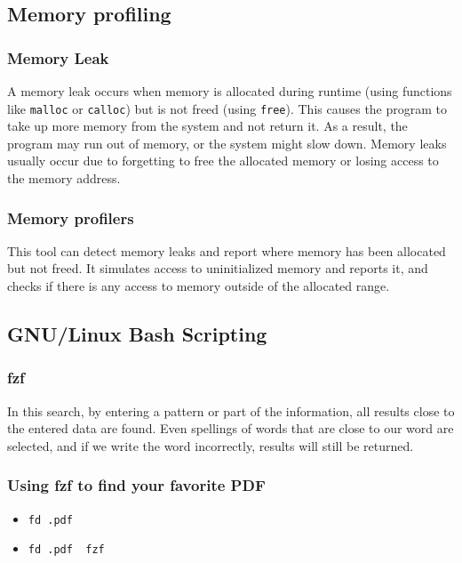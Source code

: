 \documentclass{article}
\begin{document}
    \subsection{Memory profiling}
        \subsubsection{Memory Leak}
            A memory leak occurs when memory is allocated during runtime 
            (using functions like \texttt{malloc} or \texttt{calloc}) but is 
            not freed (using \texttt{free}).
             This causes the program to take up more memory from the system 
             and not return it. As a result, the program may run out of memory, 
             or the system might slow 
             down. Memory leaks usually occur due to forgetting to free the 
             allocated memory or losing access to the memory address.


        \subsubsection{Memory profilers}
            This tool can detect memory leaks and report where memory has been 
            allocated but not freed. It simulates access to uninitialized memory
             and reports it, and checks if there is any access to memory outside 
             of the allocated range.


    \subsection{GNU/Linux Bash Scripting}
        \subsubsection{fzf}
            In this search, by entering a pattern or part of the information, all
             results close to the entered data are found. Even spellings of words 
             that are close to our word are selected, and if we write the word incorrectly,
              results will still be returned.


    \subsubsection{Using fzf to find your favorite PDF}
            \begin{itemize}
                \item 
                    \texttt{fd .pdf}

                \item 
                    \texttt{fd .pdf \textbar\ fzf}
            \end{itemize}
\end{document}
